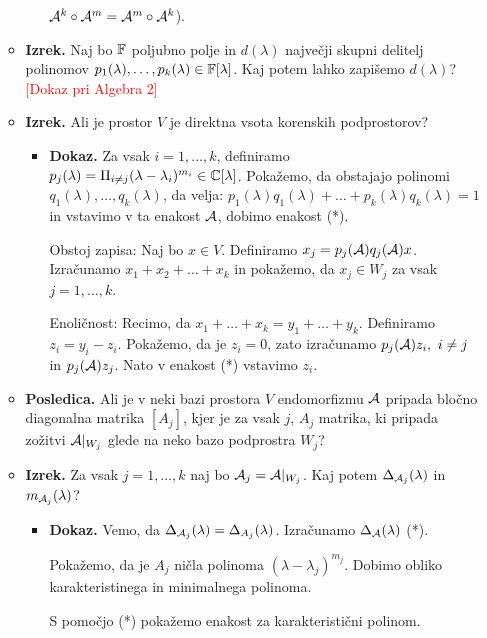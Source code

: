 \begin{enumerate}
\begin{itemize}
\begin{itemize}
            $\mathcal{A}^k \circ \mathcal{A}^m = \mathcal{A}^m \circ \mathcal{A}^k$).
        \end{itemize}
        \item \colorbox{blue!30}{\textbf{Izrek.}} Naj bo $\mathbb{F}$ poljubno polje in $d(\lambda)$ največji skupni delitelj polinomov $p_1(\lambda), \ldots, p_k(\lambda) \in \mathbb{F}[\lambda]$. Kaj potem lahko zapišemo $d(\lambda)$? \textcolor{red}{[Dokaz pri Algebra 2]}
        \item \colorbox{blue!30}{\textbf{Izrek.}} Ali je prostor $V$ je direktna vsota korenskih podprostorov?
        \begin{itemize}
            \item \colorbox{green!30}{\textbf{Dokaz.}} Za vsak $i = 1, \ldots, k$, definiramo $p_j(\lambda) = \Pi_{i \neq j}(\lambda - \lambda_i)^{m_i} \in \mathbb{C}[\lambda]$. Pokažemo, da obstajajo polinomi $q_1(\lambda), \ldots, q_k(\lambda)$, da velja: $p_1(\lambda)q_1(\lambda) + \ldots + p_k(\lambda)q_k(\lambda) = 1$ in vstavimo v ta enakost $\mathcal{A}$, dobimo enakost (*).
            
            Obstoj zapisa: Naj bo $x \in V$. Definiramo $x_j = p_j(\mathcal{A})q_j(\mathcal{A})x$. Izračunamo $x_1+x_2 + \ldots + x_k$ in pokažemo, da $x_j \in W_j$ za vsak $j = 1, \ldots, k$.

            Enoličnost: Recimo, da $x_1 + \ldots + x_k = y_1 + \ldots + y_k$. Definiramo $z_i = y_i - z_i$. Pokažemo, da je $z_i = 0$, zato izračunamo $p_j(\mathcal{A})z_i, \ i \neq j$ in $p_j(\mathcal{A})z_j$. Nato v enakost (*) vstavimo $z_i$.
        \end{itemize}
        \item \colorbox{orange!30}{\textbf{Posledica.}} Ali je v neki bazi prostora $V$ endomorfizmu $\mathcal{A}$ pripada bločno diagonalna matrika $[A_j]$, kjer je za vsak $j$, $A_j$ matrika, ki pripada zožitvi $\mathcal{A}|_{W_j}$ glede na neko bazo podprostra $W_j$? 
        \item \colorbox{blue!30}{\textbf{Izrek.}} Za vsak $j = 1, \ldots, k$ naj bo $\mathcal{A}_j = \mathcal{A}|_{W_j}$. Kaj potem $\Delta_{\mathcal{A}_j}(\lambda)$ in $m_{\mathcal{A}_j}(\lambda)$?
        \begin{itemize}
            \item \colorbox{green!30}{\textbf{Dokaz.}} Vemo, da $\Delta_{\mathcal{A}_j}(\lambda) = \Delta_{A_j}(\lambda)$. Izračunamo $\Delta_{\mathcal{A}}(\lambda)$ (*).
            
            Pokažemo, da je $A_j$ ničla polinoma $(\lambda - \lambda_j)^{m_j}$. Dobimo obliko karakteristinega in minimalnega polinoma.

            S pomočjo (*) pokažemo enakost za karakteristični polinom. 
            

\end{itemize}
\end{itemize}
\end{enumerate}
